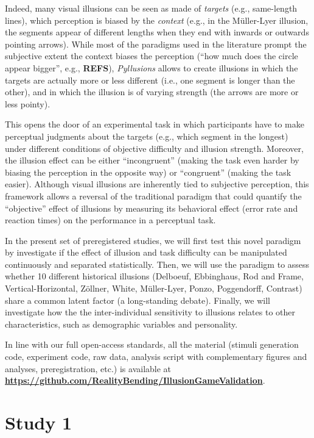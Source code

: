 \documentclass[
  man,floatsintext]{apa6}
\begin{document}
Indeed, many visual illusions can be seen as made of \emph{targets} (e.g., same-length lines), which perception is biased by the \emph{context} (e.g., in the Müller-Lyer illusion, the segments appear of different lengths when they end with inwards or outwards pointing arrows). While most of the paradigms used in the literature prompt the subjective extent the context biases the perception (``how much does the circle appear bigger'', e.g., \textbf{REFS}), \emph{Pyllusions} allows to create illusions in which the targets are actually more or less different (i.e., one segment is longer than the other), and in which the illusion is of varying strength (the arrows are more or less pointy).

This opens the door of an experimental task in which participants have to make perceptual judgments about the targets (e.g., which segment in the longest) under different conditions of objective difficulty and illusion strength. Moreover, the illusion effect can be either ``incongruent'' (making the task even harder by biasing the perception in the opposite way) or ``congruent'' (making the task easier). Although visual illusions are inherently tied to subjective perception, this framework allows a reversal of the traditional paradigm that could quantify the ``objective'' effect of illusions by measuring its behavioral effect (error rate and reaction times) on the performance in a perceptual task.

In the present set of preregistered studies, we will first test this novel paradigm by investigate if the effect of illusion and task difficulty can be manipulated continuously and separated statistically. Then, we will use the paradigm to assess whether 10 different historical illusions (Delboeuf, Ebbinghaus, Rod and Frame, Vertical-Horizontal, Zöllner, White, Müller-Lyer, Ponzo, Poggendorff, Contrast) share a common latent factor (a long-standing debate). Finally, we will investigate how the the inter-individual sensitivity to illusions relates to other characteristics, such as demographic variables and personality.

In line with our full open-access standards, all the material (stimuli generation code, experiment code, raw data, analysis script with complementary figures and analyses, preregistration, etc.) is available at \textbf{\url{https://github.com/RealityBending/IllusionGameValidation}}.

\hypertarget{study-1}{%
\section{Study 1}\label{study-1}}
\end{document}
